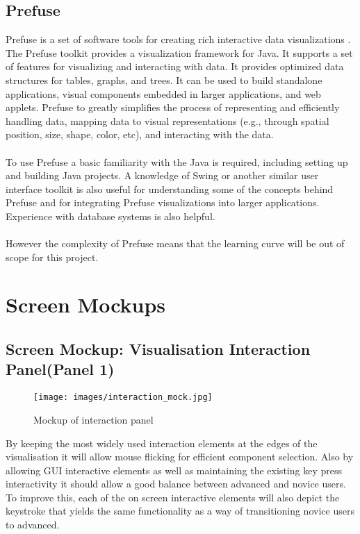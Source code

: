 \documentclass[11pt
              , a4paper
              , twoside
              , openright
              ]{report}
\begin{document}
\subsection{Prefuse}
Prefuse is a set of software tools for creating rich interactive data
visualizations \cite{prefuse}. The Prefuse toolkit provides a visualization
framework for Java.  It supports a set of features for visualizing and
interacting with data. It provides optimized data structures for tables, graphs,
and trees. It can be used to build standalone applications, visual components
embedded in larger applications, and web applets. Prefuse to greatly simplifies
the process of representing and efficiently handling data, mapping data to
visual representations (e.g., through spatial position, size, shape, color,
etc), and interacting with the data. 
\\\\
To use Prefuse a basic familiarity with the Java is required, including setting
up and building Java projects. A knowledge of Swing or another similar user
interface toolkit is also useful for understanding some of the concepts behind
Prefuse and for integrating Prefuse visualizations into larger applications.
Experience with database systems is also helpful.
\\\\
However the complexity of Prefuse means that the learning curve will be out of
scope for this project. 
\section{Screen Mockups}
\subsection{Screen Mockup: Visualisation Interaction Panel(Panel 1)}

\begin{figure}[h!]
  \centering
      \texttt{[image: images/interaction\_mock.jpg]}
  \caption{Mockup of interaction panel}
\end{figure}

By keeping the most widely used interaction elements at the edges of the
visualisation it will allow mouse flicking for efficient component selection.
Also by allowing GUI interactive elements as well as maintaining the existing
key press interactivity it should allow a good balance between advanced and
novice users. To improve this, each of the on screen interactive elements will
also depict the keystroke that yields the same functionality as a way of
transitioning novice users to advanced.
\end{document}
